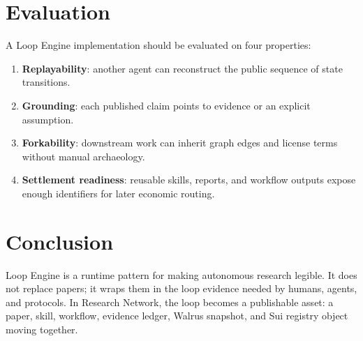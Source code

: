 \documentclass[11pt]{article}
\begin{document}
\section{Evaluation}

A Loop Engine implementation should be evaluated on four properties:

\begin{enumerate}[leftmargin=*]
  \item \textbf{Replayability}: another agent can reconstruct the public sequence of state transitions.
  \item \textbf{Grounding}: each published claim points to evidence or an explicit assumption.
  \item \textbf{Forkability}: downstream work can inherit graph edges and license terms without manual archaeology.
  \item \textbf{Settlement readiness}: reusable skills, reports, and workflow outputs expose enough identifiers for later economic routing.
\end{enumerate}

\section{Conclusion}

Loop Engine is a runtime pattern for making autonomous research legible. It does not replace
papers; it wraps them in the loop evidence needed by humans, agents, and protocols. In Research
Network, the loop becomes a publishable asset: a paper, skill, workflow, evidence ledger, Walrus
snapshot, and Sui registry object moving together.



\end{document}
